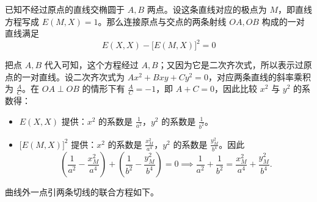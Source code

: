 \begin{conclusion}[弦对原点张角的联合方程]
    已知不经过原点的直线交椭圆于 $A, B$ 两点。设这条直线对应的极点为 $M$，即直线方程写成 $E(M,X) = 1$。那么连接原点与交点的两条射线 $OA, OB$ 构成的一对直线满足
    $$ E(X,X) - \big[E(M,X)\big]^2 = 0 $$
\end{conclusion}
把点 $A,B$ 代入可知，这个方程经过 $A,B$；又因为它是二次齐次式，所以表示过原点的一对直线。设二次齐次式为 $Ax^2+Bxy+Cy^2=0$，对应两条直线的斜率乘积为 $\frac{A}{C}$。在 $OA \perp OB$ 的情形下有 $\frac{A}{C}=-1$，即 $A+C=0$，因此比较 $x^2$ 与 $y^2$ 的系数得：
\begin{itemize}
\item $E(X,X)$ 提供：$x^2$ 的系数是 $\frac{1}{a^2}$，$y^2$ 的系数是 $\frac{1}{b^2}$。
\item $\big[E(M,X)\big]^2$ 提供：$x^2$ 的系数是 $\frac{x_M^2}{a^4}$，$y^2$ 的系数是 $\frac{y_M^2}{b^4}$。因此
\[
\left(\frac{1}{a^2} - \frac{x_M^2}{a^4}\right) + \left(\frac{1}{b^2} - \frac{y_M^2}{b^4}\right) = 0
\implies \frac{1}{a^2} + \frac{1}{b^2} = \frac{x_M^2}{a^4} + \frac{y_M^2}{b^4}.
\]
\end{itemize}
曲线外一点引两条切线的联合方程如下。

